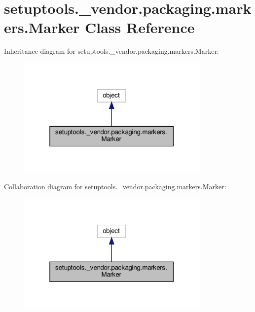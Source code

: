 \hypertarget{classsetuptools_1_1__vendor_1_1packaging_1_1markers_1_1Marker}{}\section{setuptools.\+\_\+vendor.\+packaging.\+markers.\+Marker Class Reference}
\label{classsetuptools_1_1__vendor_1_1packaging_1_1markers_1_1Marker}


Inheritance diagram for setuptools.\+\_\+vendor.\+packaging.\+markers.\+Marker\+:
\nopagebreak
\begin{figure}[H]
\begin{center}
\leavevmode
\includegraphics[width=268pt]{classsetuptools_1_1__vendor_1_1packaging_1_1markers_1_1Marker__inherit__graph}
\end{center}
\end{figure}


Collaboration diagram for setuptools.\+\_\+vendor.\+packaging.\+markers.\+Marker\+:
\nopagebreak
\begin{figure}[H]
\begin{center}
\leavevmode
\includegraphics[width=268pt]{classsetuptools_1_1__vendor_1_1packaging_1_1markers_1_1Marker__coll__graph}
\end{center}
\end{figure}
